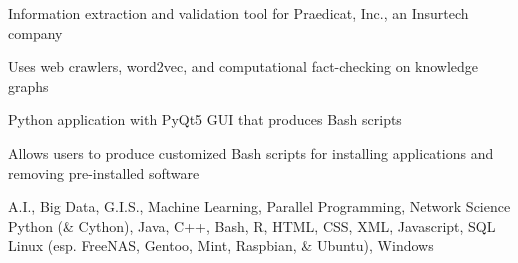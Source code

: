 \documentclass{acmresume}
\begin{document}
	   \begin{titemize}
           \item Information extraction and validation tool for Praedicat, Inc., an Insurtech company
           \item Uses web crawlers, word2vec, and computational fact-checking on knowledge graphs
       \end{titemize}
   
        \begin{titemize}
            \item Python application with PyQt5 GUI that produces Bash scripts
            \item Allows users to produce customized Bash scripts for installing applications and removing pre-installed software
        \end{titemize}
    
    
        \begin{description}[topsep=1pt,itemsep=1pt]
             A.I., Big Data, G.I.S., Machine Learning, Parallel Programming, Network Science
             Python (\& Cython), Java, C++, Bash, R, HTML, CSS, XML, Javascript, SQL
             Linux (esp. FreeNAS, Gentoo, Mint, Raspbian, \& Ubuntu), Windows
        \end{description}

	
\end{document}
